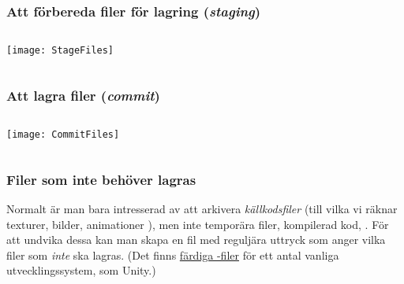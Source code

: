 \documentclass[swedish]{beamer}
\newenvironment{dialogue}{%
\VerbatimEnvironment
\begin{Verbatim}[fontsize=\footnotesize,commandchars=\#\(\)]%
}
{%
\end{Verbatim}
}
\begin{document}
\begin{frame}[fragile]
\frametitle{Att förbereda filer för lagring (\emph{staging})}
\begin{columns}
\begin{column}{0.5\textwidth}

\vspace{\baselineskip}

\texttt{[image: StageFiles]}

\end{column}
\end{columns}
\end{frame}

\begin{frame}[fragile]
\frametitle{Att lagra filer (\emph{commit})}  
\begin{columns}
\begin{column}{0.5\textwidth}

\vspace{\baselineskip}

\texttt{[image: CommitFiles]}

\end{column}
\end{columns}
\end{frame}

\begin{frame}[fragile]
\frametitle{Filer som inte behöver lagras}  
Normalt är man bara intresserad av att arkivera \emph{källkodsfiler} (till vilka vi räknar texturer, bilder, animationer \odyl), men inte temporära filer, kompilerad kod, \osv.  För att undvika dessa kan man skapa en fil  med reguljära uttryck som anger vilka filer som \emph{inte} ska lagras.  (Det finns \href{https://github.com/github/gitignore}{färdiga -filer} för ett antal vanliga utvecklingssystem, som \tex Unity.)


\end{frame}
\end{document}
